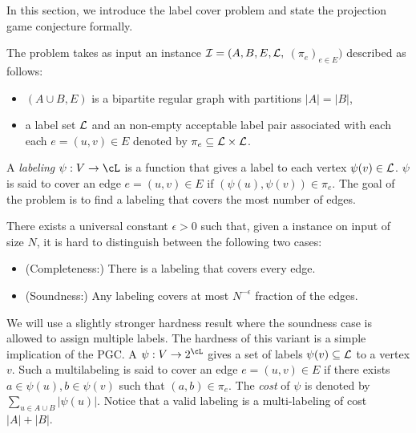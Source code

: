 In this section, we introduce the label cover problem and state the projection game conjecture formally. 


\begin{definition}[\labcov{}]\label{def:labcov}
	The \labcov{} problem takes as input an instance $\mathcal{I}=(A, B,E,\mathcal{L},$ $(\pi_e)_{e\in E})$ described as follows:
	\begin{itemize}
		\item $(A \cup B, E)$ is a bipartite regular graph with partitions $|A|=|B|$, 
		\item a label set $\mathcal{L}$ and an non-empty acceptable label pair associated with each each $e=(u,v)\in E$ denoted by $\pi_e\subseteq \mathcal{L}\times \mathcal{L}$.
	\end{itemize}
	
	A \emph{labeling} $\psi: V \to \cL$ is a function that gives a label to each vertex $\psi(v)\in\mathcal{L}$. $\psi$ is said to cover an edge $e=(u,v)\in E$ if $(\psi(u),\psi(v))\in\pi_e$. The goal of the problem is to find a labeling that covers the most number of edges.
	
\end{definition}


\begin{conjecture}[PGC]\label{con:pgc}
	There exists a universal constant $\epsilon >0$ such that, given a \labcov{} instance on input of size $N$, it is hard to distinguish between the following two cases: 
	\begin{itemize}
		\item (Completeness:) There is a labeling that covers every edge. 
		
		\item (Soundness:) Any labeling covers at most $N^{-\epsilon}$ fraction of the edges. 
	\end{itemize}
\end{conjecture} 
We will use a slightly stronger hardness result where the soundness case is allowed to assign multiple labels. The hardness of this variant is a simple implication of the PGC.  A \mlab{} $\psi:V \to 2^\cL$ gives a set of labels  $\psi(v)\subseteq\mathcal{L}$ to a vertex $v$. Such a multilabeling  is said to cover an edge $e=(u,v)\in E$ if there exists $a\in\psi(u),b\in\psi(v)$ such that $(a,b)\in\pi_e$. 
The \textit{cost} of $\psi$ is denoted by $\sum_{u \in A \cup B} |\psi(u)|$. Notice that a valid labeling is a multi-labeling of cost $|A|+|B|$.

